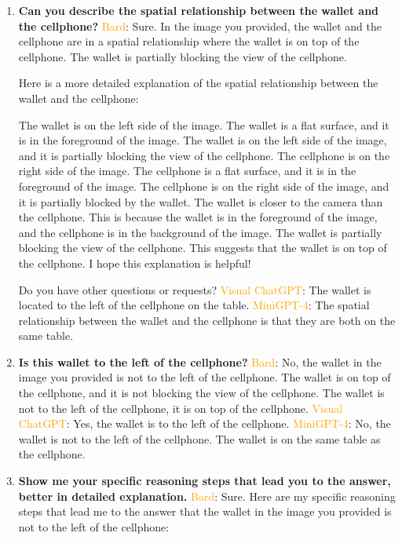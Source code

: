 \begin{enumerate}
    \item \textbf{Can you describe the spatial relationship between the wallet and the cellphone?}
    \subitem \textcolor{orange}{Bard}: 
    Sure. In the image you provided, the wallet and the cellphone are in a spatial relationship where the wallet is on top of the cellphone. The wallet is partially blocking the view of the cellphone.

    Here is a more detailed explanation of the spatial relationship between the wallet and the cellphone:

    The wallet is on the left side of the image. The wallet is a flat surface, and it is in the foreground of the image. The wallet is on the left side of the image, and it is partially blocking the view of the cellphone.
    The cellphone is on the right side of the image. The cellphone is a flat surface, and it is in the foreground of the image. The cellphone is on the right side of the image, and it is partially blocked by the wallet.
    The wallet is closer to the camera than the cellphone. This is because the wallet is in the foreground of the image, and the cellphone is in the background of the image.
    The wallet is partially blocking the view of the cellphone. This suggests that the wallet is on top of the cellphone.
    I hope this explanation is helpful!

    Do you have other questions or requests?
    \subitem \textcolor{orange}{Visual ChatGPT}: The wallet is located to the left of the cellphone on the table.
    \subitem \textcolor{orange}{MiniGPT-4}: The spatial relationship between the wallet and the cellphone is that they are both on the same table.
    \item \textbf{Is this wallet to the left of the cellphone?}
    \subitem \textcolor{orange}{Bard}: 
    No, the wallet in the image you provided is not to the left of the cellphone. The wallet is on top of the cellphone, and it is not blocking the view of the cellphone. The wallet is not to the left of the cellphone, it is on top of the cellphone.
    \subitem \textcolor{orange}{Visual ChatGPT}: Yes, the wallet is to the left of the cellphone.
    \subitem \textcolor{orange}{MiniGPT-4}: No, the wallet is not to the left of the cellphone. The wallet is on the same table as the cellphone.
    \item \textbf{Show me your specific reasoning steps that lead you to the answer, better in detailed explanation.}
    \subitem \textcolor{orange}{Bard}: 
    Sure. Here are my specific reasoning steps that lead me to the answer that the wallet in the image you provided is not to the left of the cellphone:
    

\end{enumerate}
